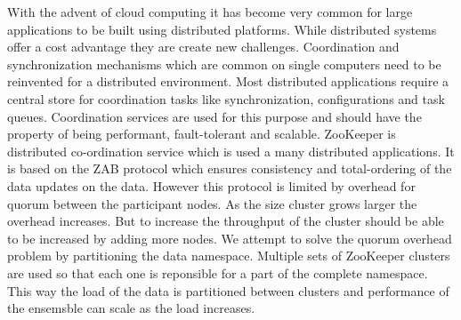 With the advent of cloud computing it has become very common for large applications to be built using distributed platforms. While distributed systems offer a cost advantage they are create new challenges. Coordination and synchronization mechanisms which are common on single computers need to be reinvented for a distributed environment. Most distributed applications require a central store for coordination tasks like synchronization, configurations and task queues. Coordination services are used for this purpose and should have the property of being performant, fault-tolerant and scalable. ZooKeeper is distributed co-ordination service which is used a many distributed applications. It is based on the ZAB protocol which ensures consistency and total-ordering of the data updates on the data. However this protocol is limited by overhead for quorum between the participant nodes. As the size cluster grows larger the overhead increases. But to increase the throughput of the cluster should be able to be increased by adding more nodes. We attempt to solve the quorum overhead problem by partitioning the data namespace. Multiple sets of ZooKeeper clusters are used so that each one is reponsible for a part of the complete namespace.  This way the load of the data is partitioned between clusters and performance of the ensemsble can scale as the load increases.
